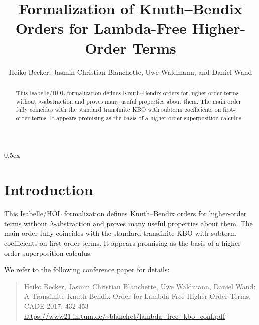 \documentclass[10pt,a4paper]{article}
\begin{document}
\title{Formalization of Knuth--Bendix Orders for Lambda-Free Higher-Order Terms}
\author{Heiko Becker, Jasmin Christian Blanchette, Uwe Waldmann, and Daniel Wand}

\maketitle

\begin{abstract}
\noindent
This Isabelle/HOL formalization defines Knuth--Bendix orders for higher-order
terms without $\lambda$-ab\-strac\-tion and proves many useful properties about
them. The main order fully coincides with the standard transfinite KBO with
subterm coefficients on first-order terms. It appears promising as the basis
of a higher-order superposition calculus.
\end{abstract}

\tableofcontents

\parindent 0pt
\parskip 0.5ex

\section{Introduction}

This Isabelle/HOL formalization defines Knuth--Bendix orders for higher-order
terms without $\lambda$-abstraction and proves many useful properties about
them. The main order fully coincides with the standard transfinite KBO with
subterm coefficients on first-order terms. It appears promising as the basis
of a higher-order superposition calculus.

We refer to the following conference paper for details:

\begin{quote}
Heiko Becker, Jasmin Christian Blanchette, Uwe Waldmann, Daniel Wand: \\
A Transfinite Knuth-Bendix Order for Lambda-Free Higher-Order Terms. \\
CADE 2017: 432-453 \\
\url{https://www21.in.tum.de/~blanchet/lambda_free_kbo_conf.pdf}
\end{quote}



%
%

%
%
\end{document}
